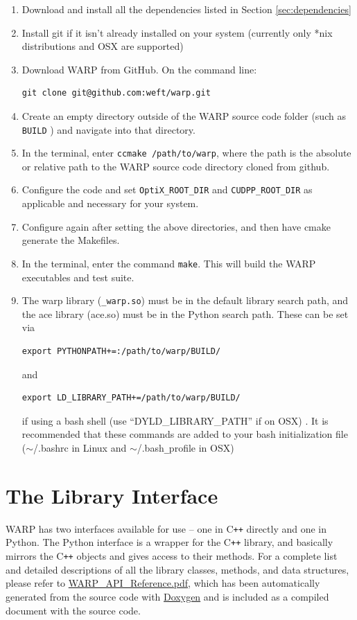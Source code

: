 \documentclass[twoside,a4paper]{refart}
\begin{document}
\begin{enumerate}
\item{Download and install all the dependencies listed in Section \ref{sec:dependencies}}
\item{Install git if it isn't already installed on your system (currently only *nix distributions and OSX are supported)}
\item{Download WARP from GitHub.  On the command line: 
\begin{verbatim}
git clone git@github.com:weft/warp.git
\end{verbatim}}
\item{Create an empty directory outside of the WARP source code folder (such as \texttt{BUILD} ) and navigate into that directory.}
\item{In the terminal, enter \texttt{ccmake /path/to/warp}, where the path is the absolute or relative 
path to the WARP source code directory cloned from github.}
\item{Configure the code and set \texttt{OptiX\_ROOT\_DIR} and \texttt{CUDPP\_ROOT\_DIR} as applicable
and necessary for your system.}
\item{Configure again after setting the above directories, and then have cmake generate the Makefiles.}
\item{In the terminal, enter the command \texttt{make}. This will build the WARP executables and test 
suite.}
\item{The warp library (\texttt{\_warp.so}) must be in the default library search path, and the ace library (ace.so) must be in the Python search path.  These can be set via
\begin{verbatim}
export PYTHONPATH+=:/path/to/warp/BUILD/
\end{verbatim} and 
\begin{verbatim}
export LD_LIBRARY_PATH+=/path/to/warp/BUILD/
\end{verbatim} 
if using a bash shell (use ``DYLD\_LIBRARY\_PATH'' if on OSX) .  It is recommended that these commands are added to your bash initialization file ($\sim$/.bashrc in Linux and $\sim$/.bash\texttt{\_}profile in OSX)}
\end{enumerate}

\section{The Library Interface}

WARP has two interfaces available for use -- one in C\texttt{++} directly and one in Python.  The Python 
interface is a wrapper for the C\texttt{++} library, and basically mirrors the C\texttt{++} objects and gives access to their methods.  For
a complete list and detailed descriptions of all the library classes, methods, and data structures, please
refer to \href{run:WARP_API_Reference.pdf}{WARP\_API\_Reference.pdf}, which has been automatically generated from the source code with
\href{http://www.doxygen.org}{Doxygen} and is included as a compiled document with the source code.
\end{document}
